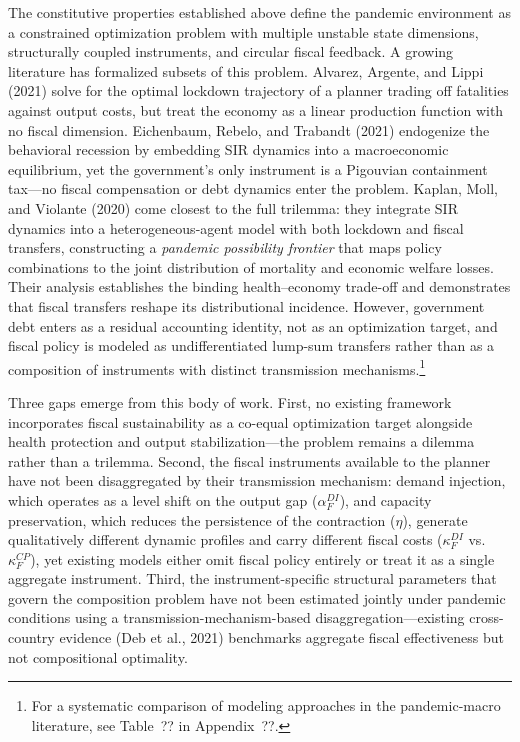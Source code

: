 


The constitutive properties established above define the pandemic environment as a constrained optimization problem with multiple unstable state dimensions, structurally coupled instruments, and circular fiscal feedback. A growing literature has formalized subsets of this problem. Alvarez, Argente, and Lippi (2021) solve for the optimal lockdown trajectory of a planner trading off fatalities against output costs, but treat the economy as a linear production function with no fiscal dimension. Eichenbaum, Rebelo, and Trabandt (2021) endogenize the behavioral recession by embedding SIR dynamics
into a macroeconomic equilibrium, yet the government's only instrument is a Pigouvian containment tax---no fiscal compensation or debt dynamics enter the problem. Kaplan, Moll, and Violante (2020) come closest to the full trilemma: they integrate SIR dynamics into a heterogeneous-agent model with both lockdown and fiscal transfers, constructing a \textit{pandemic possibility frontier} that maps policy combinations to
the joint distribution of mortality and economic welfare losses. Their analysis establishes the binding health--economy trade-off and demonstrates that fiscal transfers reshape its distributional incidence. However, government debt enters as a residual accounting identity, not as an optimization target, and fiscal policy is modeled as undifferentiated lump-sum transfers rather than as a composition of instruments with distinct transmission mechanisms.\footnote{For a systematic comparison of modeling
approaches in the pandemic-macro literature, see Table~?? in Appendix~??.}

Three gaps emerge from this body of work. First, no existing framework incorporates fiscal sustainability as a co-equal optimization target alongside health protection and output stabilization---the problem remains a dilemma rather than a trilemma. Second, the fiscal instruments available to the planner have not been disaggregated by their transmission mechanism: demand injection, which operates as a level shift on the output gap ($\alpha_F^{DI}$), and capacity preservation, which reduces the persistence of
the contraction ($\eta$), generate qualitatively different dynamic profiles and carry different fiscal costs ($\kappa_F^{DI}$ vs.\ $\kappa_F^{CP}$), yet existing models either omit fiscal policy entirely or treat it as a single aggregate instrument. Third, the instrument-specific structural parameters that govern the composition problem have not been estimated jointly under pandemic conditions using a
transmission-mechanism-based disaggregation---existing cross-country evidence (Deb et al., 2021) benchmarks aggregate fiscal effectiveness but not compositional optimality.

